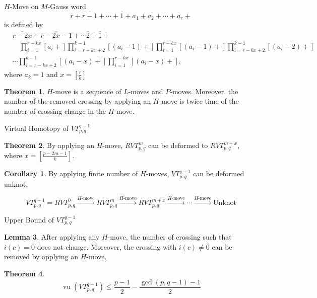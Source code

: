 \documentclass[10pt]{beamer}
\def\vu{\operatorname{vu}}
\def\vt#1#2#3{VT_{#1,#2}^{#3}}
\theoremstyle{definition}
\newtheorem{thm}{\color{orange}Theorem}[section]
\newtheorem{lem}[thm]{\color{orange}Lemma}
\newtheorem{cor}{\color{orange}Corollary}
\begin{document}
\begin{frame}[fragile]{$H$-Move}
 on $M$-Gauss word
\[
\overline{r}+\overline{r-1}+\cdots+\overline{1}+a_1+a_2+\cdots+a_r+
\]
is defined by
\begin{align*}
& \overline{r-2x}+\overline{r-2x-1}+\cdots\overline{2}+\overline{1}+\\
&\quad\prod_{i=1}^{r-kx}[a_i+]\prod_{i=r-kx+2}^{k-1}[(a_i-1)+]\prod_{i=1}^{r-kx}[(a_i-1)+]\prod_{i=r-kx+2}^{k-1}[(a_i-2)+]\\
&\cdots\prod_{i=r-kx+2}^{k-1}[(a_i-x)+]\prod_{i=1}^{r-kx}[(a_i-x)+],
\end{align*}
where $a_k=1$ and $x=\left[\frac{r}{k}\right]$
\begin{thm}
$H$-move is a sequence of $L$-moves and $P$-moves.
Moreover, the number of the removed crossing by applying an $H$-move is twice time of the number of crossing change in the $H$-move.
\end{thm}
\end{frame}


\begin{frame}[fragile]{Virtual Homotopy of $\vt{p}{q}{q-1}$}
\begin{thm}
By applying an $H$-move, $RVT_{p,q}^m$ can be deformed to $RVT_{p,q}^{m+x}$, where $x=\left[\frac{p-2m-1}{k}\right]$.
\end{thm}

\begin{cor}
By applying finite number of $H$-moves, $\vt{p}{q}{q-1}$ can be deformed unknot.
\end{cor}

\[
\vt{p}{q}{q-1}=RVT_{p,q}^0\xrightarrow{\text{$H$-move}}RVT_{p,q}^{m}\xrightarrow{\text{$H$-move}}RVT_{p,q}^{m+x}\xrightarrow{\text{$H$-move}}\cdots\xrightarrow{\text{$H$-move}}\text{Unknot}
\]
\end{frame}


\begin{frame}[fragile]{Upper Bound of $\vt{p}{q}{q-1}$}
\begin{lem}
After applying any $H$-move, the number of crossing such that $i(c)=0$ does not change.
Moreover, the crossing with $i(c)\neq0$ can be removed by applying an $H$-move.
\end{lem}

\begin{thm}
\[
\vu(\vt{p}{q}{q-1}) \le \frac{p-1}{2} - \frac{\gcd(p,q-1)-1}{2}
\]
\end{thm}
\end{frame}
\end{document}
